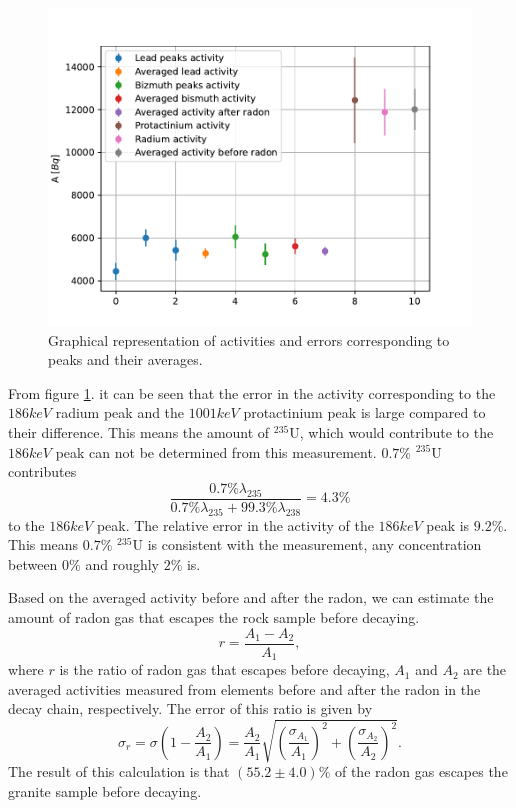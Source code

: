 \documentclass[pdftex,12pt,a4paper]{article}
\begin{document}
		\begin{figure}
			\centering
			\includegraphics[scale=1]{./figs/graniteactivities.pdf}
			\caption{Graphical representation of activities and errors corresponding to peaks and their averages.}
			\label{graniteaveragesfig}
		\end{figure}
		From figure \ref{graniteaveragesfig}. it can be seen that the error in the activity corresponding to the $186keV$ radium peak and the $1001keV$ protactinium peak is large compared to their difference. This means the amount of $^{235}\text{U}$, which would contribute to the $186keV$ peak can not be determined from this measurement. $0.7 \%$ $^{235}\text{U}$ contributes
		\begin{equation}
			\frac{0.7 \% \lambda_{235}}{0.7 \% \lambda_{235} + 99.3 \% \lambda_{238}} = 4.3 \%
		\end{equation}
		to the $186keV$ peak. The relative error in the activity of the $186keV$ peak is $9.2\%$. This means $0.7\%$ $^{235}\text{U}$ is consistent with the measurement, any concentration between $0\%$ and roughly $2\%$ is.
		
		Based on the averaged activity before and after the radon, we can estimate the amount of radon gas that escapes the rock sample before decaying.
		\begin{equation}
			r = \frac{A_1 - A_2}{A_1},
		\end{equation}
		where $r$ is the ratio of radon gas that escapes before decaying, $A_1$ and $A_2$ are the averaged activities measured from elements before and after the radon in the decay chain, respectively. The error of this ratio is given by
		\begin{equation}
			\sigma_r = \sigma\left(1 - \frac{A_2}{A_1}\right) = \frac{A_2}{A_1}\sqrt{\left(\frac{\sigma_{A_1}}{A_1}\right)^2 + \left(\frac{\sigma_{A_2}}{A_2}\right)^2}.
		\end{equation}
		The result of this calculation is that $(55.2\pm4.0)\%$ of the radon gas escapes the granite sample before decaying.
		
\end{document}
